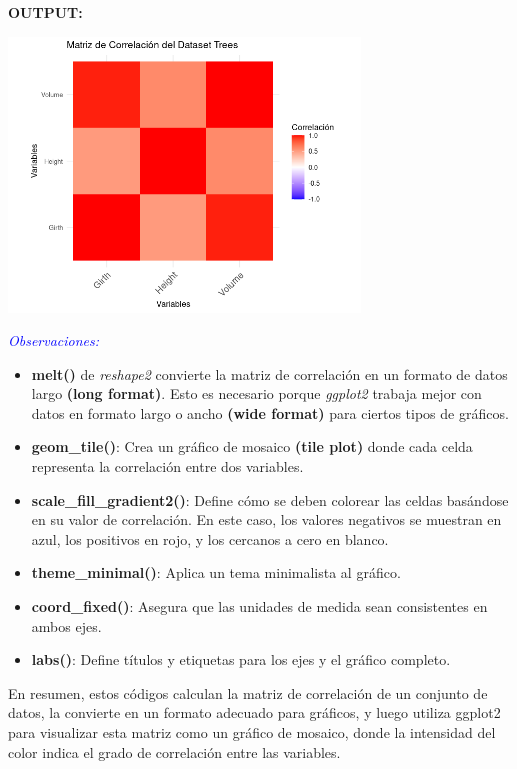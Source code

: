 \documentclass{article}
\begin{document}
\textbf{\textbf{OUTPUT}:}
\begin{center} 
\includegraphics[width=0.7\textwidth]{code/Plots/Matriz de correlacion.png}
\end{center}
\emph{\textcolor{blue}{Observaciones:}}
\begin{itemize}
    \item \textbf{melt()} de \textit{reshape2} convierte la matriz de correlación en un formato de datos largo \textbf{(long format)}. Esto es necesario porque \textit{ggplot2} trabaja mejor con datos en formato largo o ancho \textbf{(wide format)} para ciertos tipos de gráficos.
    \item \textbf{geom\_tile()}: Crea un gráfico de mosaico \textbf{(tile plot)} donde cada celda representa la correlación entre dos variables.
    \item \textbf{scale\_fill\_gradient2()}: Define cómo se deben colorear las celdas basándose en su valor de correlación. En este caso, los valores negativos se muestran en azul, los positivos en rojo, y los cercanos a cero en blanco.
    \item \textbf{theme\_minimal()}: Aplica un tema minimalista al gráfico.
    \item \textbf{coord\_fixed()}: Asegura que las unidades de medida sean consistentes en ambos ejes.
    \item \textbf{labs()}: Define títulos y etiquetas para los ejes y el gráfico completo.
\end{itemize}
En resumen, estos códigos calculan la matriz de correlación de un conjunto de datos, la convierte en un formato adecuado para gráficos, y luego utiliza ggplot2 para visualizar esta matriz como un gráfico de mosaico, donde la intensidad del color indica el grado de correlación entre las variables.
\end{document}
